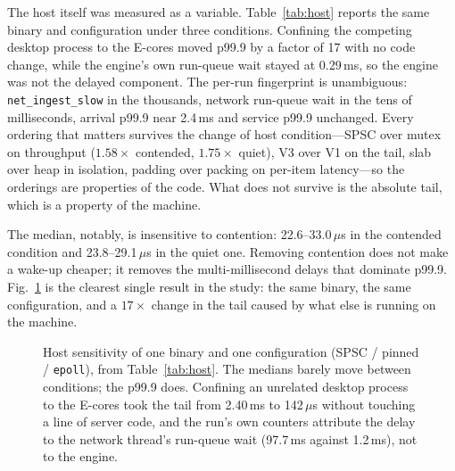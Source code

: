 \documentclass[conference]{IEEEtran}
\newcommand{\us}{\,$\mu$s}
\begin{document}
The host itself was measured as a variable. Table~\ref{tab:host} reports the same
binary and configuration under three conditions. Confining the competing desktop
process to the E-cores moved p99.9 by a factor of 17 with no code change, while
the engine's own run-queue wait stayed at 0.29\,ms, so the engine was not the
delayed component. The per-run fingerprint is unambiguous: \texttt{net\_ingest\_slow}
in the thousands, network run-queue wait in the tens of milliseconds, arrival
p99.9 near 2.4\,ms and service p99.9 unchanged. Every ordering that matters
survives the change of host condition---SPSC over mutex on throughput
($1.58\times$ contended, $1.75\times$ quiet), V3 over V1 on the tail, slab over
heap in isolation, padding over packing on per-item latency---so the orderings
are properties of the code. What does not survive is the absolute tail, which is
a property of the machine.

The median, notably, is insensitive to contention: 22.6--33.0\us{} in the
contended condition and 23.8--29.1\us{} in the quiet one. Removing contention
does not make a wake-up cheaper; it removes the multi-millisecond delays that
dominate p99.9. Fig.~\ref{fig:host} is the clearest single result in the study:
the same binary, the same configuration, and a $17\times$ change in the tail
caused by what else is running on the machine.

\begin{figure}[!t]
\centering
{}
\caption{Host sensitivity of one binary and one configuration
(SPSC / pinned / \texttt{epoll}), from Table~\ref{tab:host}. The medians barely
move between conditions; the p99.9 does. Confining an unrelated desktop process
to the E-cores took the tail from 2.40\,ms to 142\us{} without touching a line of
server code, and the run's own counters attribute the delay to the network
thread's run-queue wait (97.7\,ms against 1.2\,ms), not to the engine.}
\label{fig:host}
\end{figure}
\end{document}
